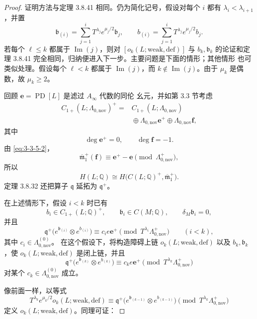 \begin{proof}
证明方法与定理 3.8.41 相同。仍为简化记号，假设对每个 $i$ 都有
$\lambda_i<\lambda_{i+1}$，并置
\[
 \mathfrak b_{(i)}
 =\sum_{j=1}^{i}T^{\lambda_j}e^{\mu_j/2}\mathfrak b_j,
 \qquad
 b_{(i)}
 =\sum_{j=1}^{i}T^{\lambda_j}e^{\mu_j/2}b_j.
\]
若每个 $\ell\leq k$ 都属于 $\operatorname{Im}(j)$，则对
$[o_k(L;\mathrm{weak,def})]$ 与 $b_k,\mathfrak b_k$ 的论证和定理
3.8.41 完全相同，归纳便进入下一步。主要问题是下面的情形；其他情形
也可类似处理。假设每个 $\ell<k$ 都属于 $\operatorname{Im}(j)$，而
$k\notin\operatorname{Im}(j)$。由于 $\mu_k$ 是偶数，故
$\mu_k\geq2$。

回顾 $\mathbf e=\operatorname{PD}[L]$ 是滤过 $A_\infty$ 代数的同伦
幺元，并如第 3.3 节考虑
\[
\begin{aligned}
 C_{1+}(L;\Lambda_{0,\mathrm{nov}})^+
 ={}&C_{1+}(L;\Lambda_{0,\mathrm{nov}})\\
 &{}\oplus\Lambda_{0,\mathrm{nov}}\mathbf e^+
 \oplus\Lambda_{0,\mathrm{nov}}\mathbf f,
\end{aligned}
\]
其中
\[
 \deg\mathbf e^+=0,\qquad\deg\mathbf f=-1.
\]
由 \eqref{eq:3-3-5-2}，
\[
 \overline{\mathfrak m}_1^+(\mathbf f)
 \equiv\mathbf e^+-\mathbf e
 \pmod{\Lambda^+_{0,\mathrm{nov}}},
\]
所以
\[
 H(L;\mathbb Q)
 \cong
 H\bigl(C(L;\mathbb Q)^+,\overline{\mathfrak m}_1^+\bigr).
\]
定理 3.8.32 还把算子 $\mathfrak q$ 延拓为 $\mathfrak q^+$。

在上述情形下，假设 $i<k$ 时已有
\[
 b_i\in C_{1+}(L;\mathbb Q)^+,
 \qquad
 \mathfrak b_i\in C(M;\mathbb Q),
 \qquad
 \delta_M\mathfrak b_i=0,
\]
并且
\[
 \mathfrak q^+\bigl(
 e^{\mathfrak b_{(i)}}\otimes e^{b_{(i)}}
 \bigr)
 \equiv c_i e\mathbf e^+
 \pmod{T^{\lambda_i}\Lambda^+_{0,\mathrm{nov}}}
 \qquad(i<k),
\]
其中 $c_i\in\Lambda^{(0)}_{0,\mathrm{nov}}$。
在这个假设下，将构造障碍上链
$o_k(L;\mathrm{weak,def})$ 以及 $b_k,\mathfrak b_k$，使
$o_k(L;\mathrm{weak,def})$ 是闭上链，并且
\[
 \mathfrak q^+\bigl(
 e^{\mathfrak b_{(k)}}\otimes e^{b_{(k)}}
 \bigr)
 \equiv c_k e\mathbf e^+
 \pmod{T^{\lambda_k}\Lambda^+_{0,\mathrm{nov}}}
\]
对某个 $c_k\in\Lambda^{(0)}_{0,\mathrm{nov}}$ 成立。

像前面一样，以等式
\[
 T^{\lambda_k}e^{\mu_k/2}o_k(L;\mathrm{weak,def})
 \equiv
 \mathfrak q^+\bigl(
 e^{\mathfrak b_{(k-1)}}\otimes e^{b_{(k-1)}}
 \bigr)
 \pmod{T^{\lambda_k}\Lambda^+_{0,\mathrm{nov}}}
\]
定义 $o_k(L;\mathrm{weak,def})$。同理可证：


\end{proof}

